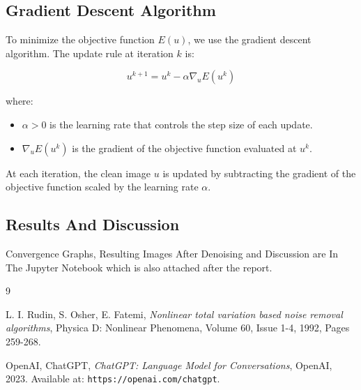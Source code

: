 \documentclass[a4paper,12pt]{article}
\begin{document}
\subsection{Gradient Descent Algorithm}

To minimize the objective function \( E(u) \), we use the gradient descent algorithm. The update rule at iteration \( k \) is:

\[
u^{k+1} = u^k - \alpha \nabla_u E(u^k)
\]

where:
\begin{itemize}
    \item \( \alpha > 0 \) is the learning rate that controls the step size of each update.
    \item \( \nabla_u E(u^k) \) is the gradient of the objective function evaluated at \( u^k \).
\end{itemize}

At each iteration, the clean image \( u \) is updated by subtracting the gradient of the objective function scaled by the learning rate \( \alpha \).

\subsection{Results And Discussion}
Convergence Graphs, Resulting Images After Denoising and Discussion are In The Jupyter Notebook which is also attached after the report.




\begin{thebibliography}{9}

L. I. Rudin, S. Osher, E. Fatemi, 
\textit{Nonlinear total variation based noise removal algorithms}, 
Physica D: Nonlinear Phenomena, 
Volume 60, Issue 1-4, 1992, Pages 259-268.

OpenAI, ChatGPT, 
\textit{ChatGPT: Language Model for Conversations}, 
OpenAI, 2023. Available at: \texttt{https://openai.com/chatgpt}.

\end{thebibliography}
\end{document}
